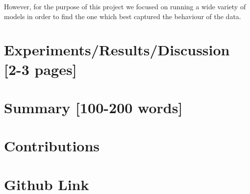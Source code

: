 \documentclass[10pt, a4]{article} %
\begin{document}
However, for the purpose of this project we focused on running a wide variety of models in order to find the one which best captured the behaviour of the data.



\section*{Experiments/Results/Discussion [2-3 pages]}
\section*{Summary [100-200 words]}
\section*{Contributions}
\section*{Github Link}
\end{document}
